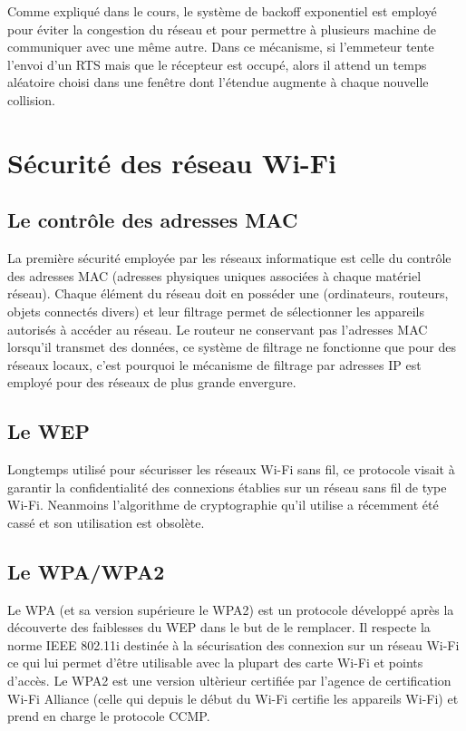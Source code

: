 \documentclass[12pt]{article}
\begin{document}
Comme expliqué dans le cours, le système de backoff exponentiel est employé pour éviter la congestion du réseau et pour permettre à plusieurs machine de communiquer avec une même autre. Dans ce mécanisme, si l'emmeteur tente l'envoi d'un RTS mais que le récepteur est occupé, alors il attend un temps aléatoire choisi dans une fenêtre dont l'étendue augmente à chaque nouvelle collision.

\newpage
\section{Sécurité des réseau Wi-Fi}

\subsection{Le contrôle des adresses MAC}
La première sécurité employée par les réseaux informatique est celle du contrôle des adresses MAC (adresses physiques uniques associées à chaque matériel réseau). Chaque élément du réseau doit en posséder une (ordinateurs, routeurs, objets connectés divers) et leur filtrage permet de sélectionner les appareils autorisés à accéder au réseau. Le routeur ne conservant pas l'adresses MAC lorsqu'il transmet des données, ce système de filtrage ne fonctionne que pour des réseaux locaux, c'est pourquoi le mécanisme de filtrage par adresses IP est employé pour des réseaux de plus grande envergure.

\subsection{Le WEP}
Longtemps utilisé pour sécurisser les réseaux Wi-Fi sans fil, ce protocole visait à garantir la confidentialité des connexions établies sur un réseau sans fil de type Wi-Fi. Neanmoins l'algorithme de cryptographie qu'il utilise a récemment été cassé et son utilisation est obsolète.

\subsection{Le WPA/WPA2}
Le WPA (et sa version supérieure le WPA2) est un protocole développé après la découverte des faiblesses du WEP dans le but de le remplacer. Il respecte la norme IEEE 802.11i destinée à la sécurisation des connexion sur un réseau Wi-Fi ce qui lui permet d'être utilisable avec la plupart des carte Wi-Fi et points d'accès. Le WPA2 est une version ultèrieur certifiée par l'agence de certification Wi-Fi Alliance (celle qui depuis le début du Wi-Fi certifie les appareils Wi-Fi) et prend en charge le protocole CCMP.
\end{document}
